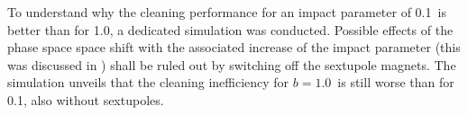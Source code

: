 
To understand why the cleaning performance for an impact parameter of 0.1\mum\, is better than for 1.0\mum, a dedicated simulation was conducted. Possible effects of the phase space space shift with the associated increase of the impact parameter (this was discussed in ) shall be ruled out by switching off the sextupole magnets. The simulation unveils that the cleaning inefficiency for $b=1.0$\mum\, is still worse than for 0.1\mum, also without sextupoles. 


